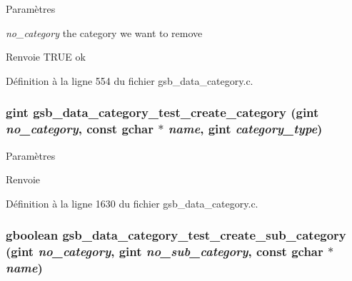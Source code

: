 \begin{DoxyParams}{Paramètres}
\item[{\em no\_\-category}]the category we want to remove\end{DoxyParams}
\begin{DoxyReturn}{Renvoie}
TRUE ok 
\end{DoxyReturn}


Définition à la ligne 554 du fichier gsb\_\-data\_\-category.c.

\subsubsection[{gsb\_\-data\_\-category\_\-test\_\-create\_\-category}]{\setlength{\rightskip}{0pt plus 5cm}gint gsb\_\-data\_\-category\_\-test\_\-create\_\-category (gint {\em no\_\-category}, \/  const gchar $\ast$ {\em name}, \/  gint {\em category\_\-type})}\label{gsb__data__category_8c_a5699c010964e46bf1579ff0b17d84242}

\begin{DoxyParams}{Paramètres}
\item[{\em }]\end{DoxyParams}
\begin{DoxyReturn}{Renvoie}

\end{DoxyReturn}


Définition à la ligne 1630 du fichier gsb\_\-data\_\-category.c.

\subsubsection[{gsb\_\-data\_\-category\_\-test\_\-create\_\-sub\_\-category}]{\setlength{\rightskip}{0pt plus 5cm}gboolean gsb\_\-data\_\-category\_\-test\_\-create\_\-sub\_\-category (gint {\em no\_\-category}, \/  gint {\em no\_\-sub\_\-category}, \/  const gchar $\ast$ {\em name})}\label{gsb__data__category_8c_ab7e2bf16a1622e1a01729e05d081aaf6}


